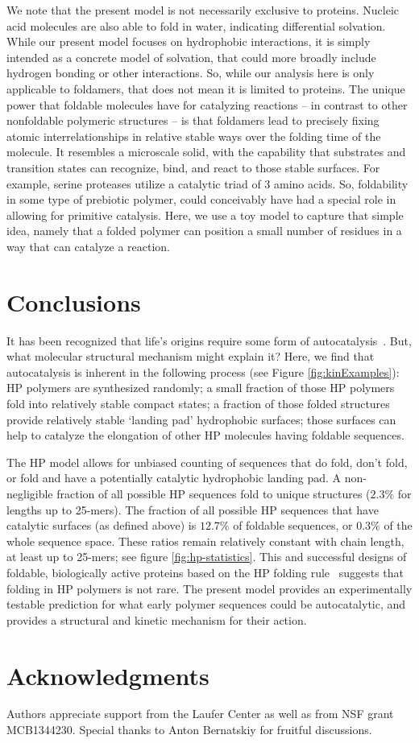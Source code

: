 \documentclass[journal=jacsat,manuscript=article,layout=twocolumn]{achemso}
\begin{document}
We note that the present model is not necessarily exclusive to proteins.  Nucleic acid molecules 
are also able to fold in water, indicating differential solvation.  While our present model 
focuses 
on hydrophobic interactions, it is simply intended as a concrete model of solvation, that could 
more broadly include hydrogen bonding or other interactions.  So, while our analysis here is only 
applicable to foldamers, that does not mean it is limited to proteins.  The unique power that 
foldable molecules have for catalyzing reactions -- in contrast to other nonfoldable polymeric 
structures -- is that foldamers lead to precisely fixing atomic interrelationships in relative 
stable ways over the folding time of the molecule.  It resembles a microscale solid, with the 
capability that substrates and transition states can recognize, bind, and react to those stable 
surfaces. For example, serine proteases utilize a catalytic triad of 3 amino acids.  So, 
foldability 
in some type of prebiotic polymer, could conceivably have had a special role in allowing for 
primitive catalysis.  Here, we use a toy model to capture that simple idea, namely that a folded 
polymer can position a small number of residues in a way that can catalyze a reaction.



\section{Conclusions}
\label{sec:evolution}
 It has been recognized that life's origins require some form of 
autocatalysis~\cite{Kauffman1986,Dyson1985,Eigen1978}.  But, what molecular structural mechanism 
might explain it?  Here, we find that autocatalysis is inherent in the following process (see 
Figure \ref{fig:kinExamples}):  HP polymers 
are synthesized randomly; a small fraction of those HP polymers fold into relatively stable 
compact 
states; a fraction of those folded structures provide relatively stable `landing pad' hydrophobic 
surfaces; those surfaces can help to catalyze the elongation of other HP molecules having foldable 
sequences.

 The HP model allows for unbiased counting of sequences that do fold, don't fold, or fold and have 
a potentially catalytic hydrophobic landing pad.  A non-negligible fraction of all possible HP 
sequences fold to unique structures ($2.3\% $ for lengths up to 25-mers). The fraction of all 
possible HP sequences that have catalytic surfaces (as defined above) is $12.7\%$ of foldable 
sequences, or $0.3\%$ of the whole sequence space.  These ratios remain relatively constant with 
chain length, at least up to 25-mers; see figure \ref{fig:hp-statistics}.  This and successful 
designs of foldable, biologically active proteins based on the HP folding rule~\cite{Murphy2015} 
suggests that folding in HP polymers is not rare.  
   The present model provides an experimentally testable prediction for what early 
  polymer sequences could be autocatalytic, and provides a structural and kinetic mechanism for 
their action. 

\section{Acknowledgments}
Authors appreciate support from the Laufer Center as well as from NSF grant MCB1344230. Special 
thanks to Anton Bernatskiy for fruitful discussions.



\end{document}

